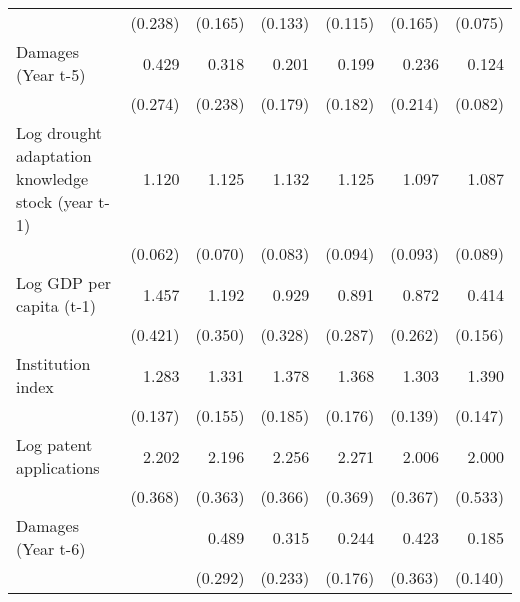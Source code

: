 \begin{table}[htbp]
\begin{tabular}{l*{6}{D{.}{.}{-1}}}
                    &     (0.238)         &     (0.165)         &     (0.133)         &     (0.115)         &     (0.165)         &     (0.075)         \\
\addlinespace
Damages (Year t-5)  &       0.429         &       0.318\sym{\%}  &       0.201\sym{*}  &       0.199\sym{*}  &       0.236\sym{\%}  &       0.124\sym{***}\\
                    &     (0.274)         &     (0.238)         &     (0.179)         &     (0.182)         &     (0.214)         &     (0.082)         \\
\addlinespace
Log drought adaptation knowledge stock (year t-1)&       1.120\sym{**} &       1.125\sym{*}  &       1.132\sym{*}  &       1.125         &       1.097         &       1.087         \\
                    &     (0.062)         &     (0.070)         &     (0.083)         &     (0.094)         &     (0.093)         &     (0.089)         \\
\addlinespace
Log GDP per capita (t-1)&       1.457         &       1.192         &       0.929         &       0.891         &       0.872         &       0.414\sym{**} \\
                    &     (0.421)         &     (0.350)         &     (0.328)         &     (0.287)         &     (0.262)         &     (0.156)         \\
\addlinespace
Institution index   &       1.283\sym{**} &       1.331\sym{**} &       1.378\sym{**} &       1.368\sym{**} &       1.303\sym{**} &       1.390\sym{***}\\
                    &     (0.137)         &     (0.155)         &     (0.185)         &     (0.176)         &     (0.139)         &     (0.147)         \\
\addlinespace
Log patent applications&       2.202\sym{***}&       2.196\sym{***}&       2.256\sym{***}&       2.271\sym{***}&       2.006\sym{***}&       2.000\sym{***}\\
                    &     (0.368)         &     (0.363)         &     (0.366)         &     (0.369)         &     (0.367)         &     (0.533)         \\
\addlinespace
Damages (Year t-6)  &                     &       0.489         &       0.315\sym{\%}  &       0.244\sym{*}  &       0.423         &       0.185\sym{**} \\
                    &                     &     (0.292)         &     (0.233)         &     (0.176)         &     (0.363)         &     (0.140)         \\

\end{tabular}
\end{table}

